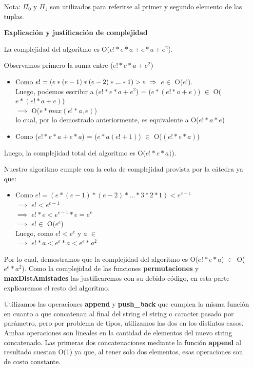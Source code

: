 \documentclass[spanish,a4paper]{article}
\begin{document}
\vspace{1mm}
Nota: $\Pi_0$ y $\Pi_1$ son utilizados para referirse al primer y segundo elemento de las tuplas.

\vspace{3mm}
\begin{center}
\textbf{Explicación y justificación de complejidad} \\ 
\end{center} 

La complejidad del algoritmo es O($e!*e*a + e*a + e^{2}$).

Observamos primero la suma entre ($e!*e*a + e^{2}$)
\begin{itemize}
\item Como $e! = (e*(e-1)*(e-2)*...*1) > e \\ \implies $ $e \in$ O($e!$). \\ Luego, podemos escribir a 
  ($e!*e*a + e^2$) = ($e *(e!*a + e)$) $\in$ O($e *(e!*a + e)$) \\ $\implies$ O($e*max(e!*a, e)$) \\ lo cual, por lo demostrado anteriormente, es equivalente a O($e!*a*e$)
\item Como ($e!*e*a + e*a$) = ($e*a (e! + 1)$) $\in$ O($(e!*e*a)$)
\end{itemize}
Luego, la complejidad total del algoritmo es O($e!*e*a)$).

Nuestro algoritmo cumple con la cota de complejidad provista por la cátedra ya que:
\begin{itemize}
  \item Como $e! = (e*(e-1)*(e-2)*...*3*2*1) < e^{e-1}$ \\ $\implies$ $e! < e^{e-1}$ \\ $\implies$ $e!*e < e^{e-1}*e 
    = e^{e}$ \\ $\implies$ $e! \in$ O($e^e$) \\
    Luego, como $e! < e^e$ y $a$ $\in$ \\ $\implies$ $e!*a < e^e*a < e^e*a^2$
\end{itemize}
Por lo cual, demostramos que la complejidad del algoritmo es O($e!*e*a$) $\in$ O($e^e*a^2$).
Como la complejidad de las funciones \textbf{permutaciones} 
y \textbf{maxDistAmistades} las justificaremos con su debido código, en esta parte explicaremos el resto del 
algoritmo. 

Utilizamos las operaciones \textbf{append} y \textbf{push\_back} que cumplen la misma función en cuanto a que
concatenan al final del string el string o caracter pasado por parámetro, pero por problema de tipos, 
utilizamos las dos en los distintos casos. Ambas operaciones son lineales en la cantidad de elementos del nuevo string concatenado.
Las primeras dos concatenaciones mediante la función \textbf{append} al resultado cuestan O(1) ya que, al 
tener solo dos elementos, esas operaciones son de costo constante.
\end{document}
